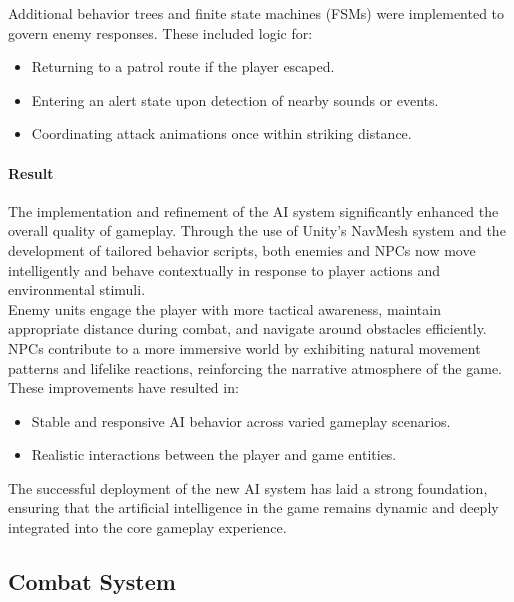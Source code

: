 \documentclass{article}
\begin{document}
Additional behavior trees and finite state machines (FSMs) were implemented to govern enemy responses. These included logic for:
\begin{itemize}
    \item Returning to a patrol route if the player escaped.
    \item Entering an alert state upon detection of nearby sounds or events.
    \item Coordinating attack animations once within striking distance.
\end{itemize}

\paragraph{Result}\hfill

The implementation and refinement of the AI system significantly enhanced the overall quality of gameplay. Through the use of Unity's NavMesh system and the development of tailored behavior scripts, both enemies and NPCs now move intelligently and behave contextually in response to player actions and environmental stimuli.\\

Enemy units engage the player with more tactical awareness, maintain appropriate distance during combat, and navigate around obstacles efficiently. NPCs contribute to a more immersive world by exhibiting natural movement patterns and lifelike reactions, reinforcing the narrative atmosphere of the game.\\

These improvements have resulted in:
\begin{itemize}
    \item Stable and responsive AI behavior across varied gameplay scenarios.
    \item Realistic interactions between the player and game entities.    
\end{itemize}

The successful deployment of the new AI system has laid a strong foundation, ensuring that the artificial intelligence in the game remains dynamic and deeply integrated into the core gameplay experience.










\newpage
\subsection{Combat System}
\end{document}
